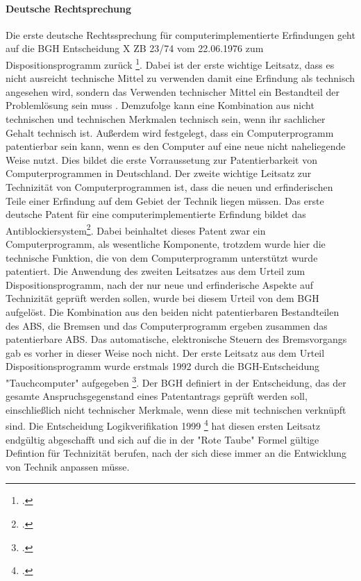 \paragraph{Deutsche Rechtsprechung\label{par:deur}}
Die erste deutsche Rechtssprechung für computerimplementierte Erfindungen
geht auf die 
BGH Entscheidung X ZB 23/74 vom 22.06.1976 zum Dispositionsprogramm zurück 
\footcite{BGH22061976}. 
Dabei ist der erste wichtige Leitsatz, dass es nicht ausreicht technische Mittel
zu verwenden damit eine Erfindung als technisch angesehen wird, 
sondern das Verwenden technischer Mittel ein Bestandteil der Problemlösung sein muss .
Demzufolge kann eine Kombination aus nicht technischen und technischen 
Merkmalen technisch sein, wenn ihr sachlicher Gehalt technisch ist.
Außerdem wird festgelegt, dass ein Computerprogramm patentierbar sein
kann, wenn es den Computer auf eine neue nicht naheliegende Weise nutzt.
Dies bildet die erste Vorraussetung zur Patentierbarkeit von Computerprogrammen
in Deutschland. 
Der zweite wichtige Leitsatz zur Technizität von Computerprogrammen ist,
dass die neuen und erfinderischen Teile 
einer Erfindung auf dem Gebiet der Technik liegen müssen.
Das erste deutsche Patent für eine computerimplementierte Erfindung bildet 
das Antiblockiersystem\footcite{Bundesgerichtshof13051980}.
Dabei beinhaltet dieses Patent zwar ein Computerprogramm,
als wesentliche Komponente, trotzdem wurde hier die technische Funktion,
die von dem Computerprogramm unterstützt wurde patentiert.
Die Anwendung des zweiten Leitsatzes aus dem Urteil zum Dispositionsprogramm, 
nach der nur neue und erfinderische Aspekte auf Technizität geprüft werden sollen,
wurde bei diesem Urteil von dem BGH aufgelöst. 
Die Kombination aus den beiden nicht patentierbaren Bestandteilen
des ABS, die Bremsen und das Computerprogramm ergeben zusammen 
das patentierbare ABS. 
Das automatische, elektronische Steuern des Bremsvorgangs gab es vorher 
in dieser Weise noch nicht.
Der erste Leitsatz aus dem Urteil Dispositionsprogramm wurde
erstmals 1992 durch die BGH-Entscheidung "Tauchcomputer"
aufgegeben \footcite{BGH04021992}. 
Der BGH definiert in der Entscheidung, das der gesamte Anspruchsgegenstand
eines Patentantrags geprüft werden soll, 
einschließlich nicht technischer Merkmale,
wenn diese mit technischen verknüpft sind.
Die Entscheidung Logikverifikation 1999 \footcite{BGH13121999}
hat diesen ersten Leitsatz endgültig abgeschafft und
sich auf die in der "Rote Taube" Formel gültige Defintion für Technizität
berufen, nach der sich diese 
immer an die Entwicklung von Technik anpassen müsse.
